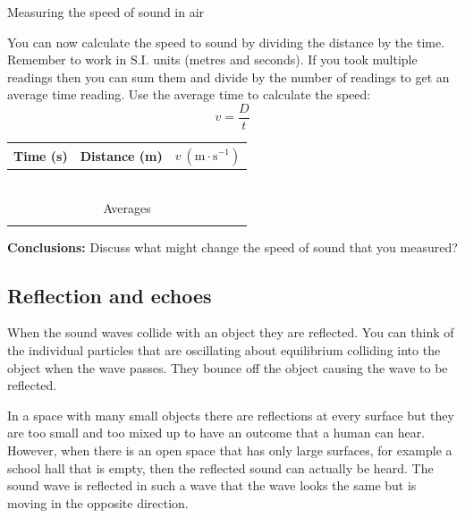 \begin{i_experiment}{Measuring the speed of sound in air}
\begin{minipage}{.45\textwidth}
You can now calculate the speed to sound by dividing the distance by the time. Remember to work in S.I. units (metres and seconds). If you took multiple readings then you can sum them and divide by the number of readings to get an average time reading. Use the average time to calculate the speed:
\begin{equation*}
 v = \frac{D}{t}
\end{equation*} 
\end{minipage}\hspace{.03\textwidth}
\begin{minipage}{.5\textwidth}
\begin{table}[H]
 \begin{tabular}{|c|c|c|}\hline\hline
Time (s) & Distance (m) & $v~(\text{m}\cdot\text{s}^{-1})$ \\\hline
 & & \\\hline 
 & & \\\hline 
 & & \\\hline 
 & & \\\hline 
 & & \\\hline 
 & & \\\hline \hline
\multicolumn{3}{|c|}{Averages} \\ \hline
 & & \\\hline 
 \end{tabular}
\end{table}
\end{minipage}
\textbf{Conclusions:}
Discuss what might change the speed of sound that you measured? 
\end{i_experiment}

\subsection{Reflection and echoes}

When the sound waves collide with an object they are reflected. You can think of the individual particles that are oscillating about equilibrium colliding into the object when the wave passes. They bounce off the object causing the wave to be reflected.

In a space with many small objects there are reflections at every surface but they are too small and too mixed up to have an outcome that a human can hear. However, when there is an open space that has only large surfaces, for example a school hall that is empty, then the reflected sound can actually be heard. The sound wave is reflected in such a wave that the wave looks the same but is moving in the opposite direction.

